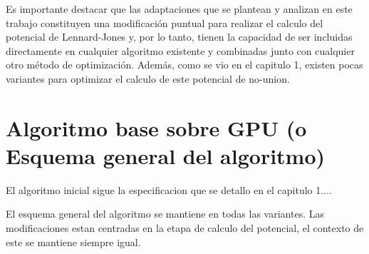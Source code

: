 \documentclass[a4paper,10pt]{report}
\begin{document}
Es importante destacar que las adaptaciones que se plantean y analizan en este trabajo constituyen una modificación puntual para realizar el calculo del potencial de Lennard-Jones y, por lo tanto, tienen la capacidad de ser incluidas directamente en cualquier algoritmo existente y combinadas junto con cualquier otro método de optimización.
Además, como se vio en el capitulo 1, existen pocas variantes para optimizar el calculo de este potencial de no-union.

\section{Algoritmo base sobre GPU (o Esquema general del algoritmo)}




El algoritmo inicial sigue la especificacion que se detallo en el capitulo 1....

El esquema general del algoritmo se mantiene en todas las variantes. Las modificaciones estan centradas en la etapa de calculo del potencial, el contexto de este se mantiene siempre igual.
\end{document}
